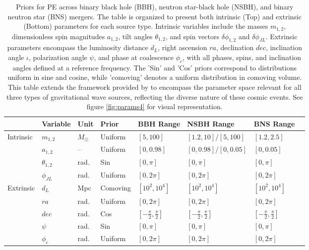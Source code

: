 \documentclass[12pt]{article}
\begin{document}
\begin{table}[ht]
\centering
\begin{tabular}{@{} ll ll ll ll @{}}
\toprule
& Variable & Unit & Prior & BBH Range & NSBH Range & BNS Range \\
\midrule
\multirow{4}{*}{Intrinsic}
& \( m_{1,2} \) & \( M_{\odot} \) & Uniform & \( [5, 100] \) & \( [1.2, 10] / [5, 100] \) & \( [1.2, 2.5] \) \\
& \( a_{1,2} \) & -- & Uniform & \( [0, 0.98] \) & \( [0, 0.98] / [0, 0.05] \) & \( [0, 0.05] \) \\
& \( \theta_{1,2} \) & rad. & Sin & \( [0, \pi] \) & \( [0, \pi] \) & \( [0, \pi] \) \\
& \( \phi_{JL} \) & rad. & Uniform & \( [0, 2\pi] \) & \( [0, 2\pi] \) & \( [0, 2\pi] \) \\
\midrule %
\multirow{5}{*}{Extrinsic}
& \( d_L \) & Mpc & Comoving & \( [10^2, 10^4] \) & \( [10^2, 10^4] \) & \( [10^2, 10^4] \) \\
& \( ra \) & rad. & Uniform & \( [0, 2\pi] \) & \( [0, 2\pi] \) & \( [0, 2\pi] \) \\
& \( dec \) & rad. & Cos & \( [-\frac{\pi}{2}, \frac{\pi}{2}] \) & \( [-\frac{\pi}{2}, \frac{\pi}{2}] \) & \( [-\frac{\pi}{2}, \frac{\pi}{2}] \) \\
& \( \psi \) & rad. & Sin & \( [0, \pi] \) & \( [0, \pi] \) & \( [0, \pi] \) \\
& \( \phi_c \) & rad. & Uniform & \( [0, 2\pi] \) & \( [0, 2\pi] \) & \( [0, 2\pi] \) \\
\bottomrule
\end{tabular}
\caption[Priors for PE across GW source estimation]{Priors for PE across binary black hole (BBH), neutron star-black hole (NSBH), and binary neutron star (BNS) mergers. The table is organized to present both intrinsic (Top) and extrinsic (Bottom) parameters for each source type. Intrinsic variables include the masses \( m_{1,2} \), dimensionless spin magnitudes \( a_{1,2} \), tilt angles \( \theta_{1,2} \), and spin vectors \( \delta\phi_{1,2} \) and \( \delta\phi_{JL} \). Extrinsic parameters encompass the luminosity distance \( d_L \), right ascension \( ra \), declination \( dec \), inclination angle \( \iota \), polarization angle \( \psi \), and phase at coalescence \( \phi_c \), with all phases, spins, and inclination angles defined at a reference frequency. The 'Sin' and 'Cos' priors correspond to distributions uniform in sine and cosine, while 'comoving' denotes a uniform distribution in comoving volume. This table extends the framework provided by \cite{Bilby: A user-friendly} to encompass the parameter space relevant for all three types of gravitational wave sources, reflecting the diverse nature of these cosmic events. See figure \ref{fig:params4} for visual representation.}
\label{table:gw_parameters_ranges}
\end{table}
\end{document}
